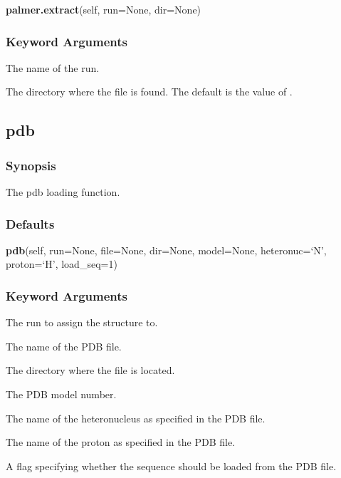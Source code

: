 \textsf{\textbf{palmer.extract}(self, run=None, dir=None)}


\subsubsection{Keyword Arguments}

  The name of the run. 

  The directory where the file  is found.  The default is the value of . 





\newpage

\subsection{pdb}


\subsubsection{Synopsis}

The pdb loading function.



\subsubsection{Defaults}

\textsf{\textbf{pdb}(self, run=None, file=None, dir=None, model=None, heteronuc=`N', proton=`H', load\_seq=1)}


\subsubsection{Keyword Arguments}

  The run to assign the structure to. 

  The name of the PDB file. 

  The directory where the file is located. 

  The PDB model number. 

  The name of the heteronucleus as specified in the PDB file. 

  The name of the proton as specified in the PDB file. 

  A flag specifying whether the sequence should be loaded from the PDB file. 





